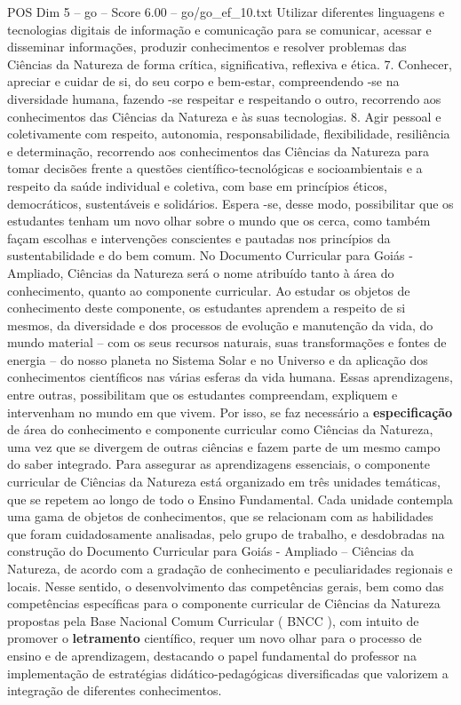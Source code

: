 \begin{textsample}{POS Dim 5 – go – Score 6.00 – go/go\_ef\_10.txt}
Utilizar diferentes linguagens e tecnologias digitais de informação e comunicação para se comunicar, acessar e disseminar informações, produzir conhecimentos e resolver problemas das Ciências da Natureza de forma crítica, significativa, reflexiva e ética. 7.
Conhecer, apreciar e cuidar de si, do seu corpo e bem-estar, compreendendo -se na diversidade humana, fazendo -se respeitar e respeitando o outro, recorrendo aos conhecimentos das Ciências da Natureza e às suas tecnologias. 8.
Agir pessoal e coletivamente com respeito, autonomia, responsabilidade, flexibilidade, resiliência e determinação, recorrendo aos conhecimentos das Ciências da Natureza para tomar decisões frente a questões científico-tecnológicas e socioambientais e a respeito da saúde individual e coletiva, com base em princípios éticos, democráticos, sustentáveis e solidários.
Espera -se, desse modo, possibilitar que os estudantes tenham um novo olhar sobre o mundo que os cerca, como também façam escolhas e intervenções conscientes e pautadas nos princípios da sustentabilidade e do bem comum.
No Documento Curricular para Goiás - Ampliado, Ciências da Natureza será o nome atribuído tanto à área do conhecimento, quanto ao componente curricular.
Ao estudar os objetos de conhecimento deste componente, os estudantes aprendem a respeito de si mesmos, da diversidade e dos processos de evolução e manutenção da vida, do mundo material – com os seus recursos naturais, suas transformações e fontes de energia – do nosso planeta no Sistema Solar e no Universo e da aplicação dos conhecimentos científicos nas várias esferas da vida humana.
Essas aprendizagens, entre outras, possibilitam que os estudantes compreendam, expliquem e intervenham no mundo em que vivem.
Por isso, se faz necessário a \textbf{especificação} de área do conhecimento e componente curricular como Ciências da Natureza, uma vez que se divergem de outras ciências e fazem parte de um mesmo campo do saber integrado.
Para assegurar as aprendizagens essenciais, o componente curricular de Ciências da Natureza está organizado em três unidades temáticas, que se repetem ao longo de todo o Ensino Fundamental.
Cada unidade contempla uma gama de objetos de conhecimentos, que se relacionam com as habilidades que foram cuidadosamente analisadas, pelo grupo de trabalho, e desdobradas na construção do Documento Curricular para Goiás - Ampliado – Ciências da Natureza, de acordo com a gradação de conhecimento e peculiaridades regionais e locais.
Nesse sentido, o desenvolvimento das competências gerais, bem como das competências específicas para o componente curricular de Ciências da Natureza propostas pela Base Nacional Comum Curricular ( BNCC ), com intuito de promover o \textbf{letramento} científico, requer um novo olhar para o processo de ensino e de aprendizagem, destacando o papel fundamental do professor na implementação de estratégias didático-pedagógicas diversificadas que valorizem a integração de diferentes conhecimentos.

\end{textsample}
